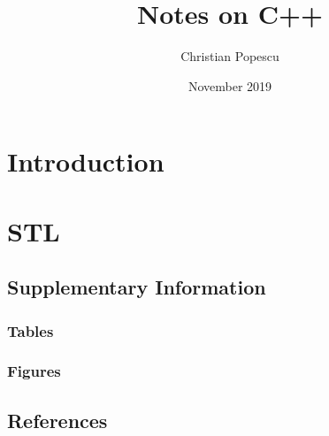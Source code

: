 \documentclass[a4paper,12pt]{book}
\begin{document}
\author{Christian Popescu}
\title{Notes on C++}
\date{November 2019}

\frontmatter
\maketitle
\tableofcontents
\setcounter{secnumdepth}{5}

\mainmatter
\part{Introduction}

\part{STL}

\backmatter
\begin{appendices}
	
	\chapter{Supplementary Information}
	
	\section{Tables}
	
	\section{Figures}
	
	\chapter{References}
	
\printbibliography
	
%	
	
\end{appendices}
\end{document}
